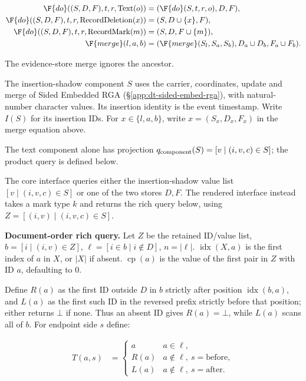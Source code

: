 \[
\begin{aligned}\F{do}((S,D,F),t,r,\operatorname{Text}(o))&=(\F{do}(S,t,r,o),D,F),\\\F{do}((S,D,F),t,r,\operatorname{RecordDeletion}(x))&=(S,D\cup\{x\},F),\\\F{do}((S,D,F),t,r,\operatorname{RecordMark}(m))&=(S,D,F\cup\{m\}),\\\F{merge}(l,a,b)&=(\F{merge}(S_l,S_a,S_b),D_a\cup D_b,F_a\cup F_b).\end{aligned}
\]


The evidence-store merge ignores the ancestor.

The insertion-shadow component $S$ uses the carrier, coordinates, update
and merge of Sided Embedded RGA (\S\ref{app:dt-sided-embed-rga}), with
natural-number character values. Its insertion identity is the event timestamp.
Write $I(S)$ for its insertion IDs.
For $x\in\{l,a,b\}$, write $x=(S_x,D_x,F_x)$ in the merge equation above.

The text component alone has projection $q_{\rm component}(S)=[v\mid(i,v,c)\in S]$; the product query is defined below.

The core interface queries either the insertion-shadow value list
$[v\mid(i,v,c)\in S]$ or one of the two stores $D,F$. The rendered
interface instead takes a mark type $k$ and returns the rich query below,
using $Z=[(i,v)\mid(i,v,c)\in S]$.

\textbf{Document-order rich query.} Let $Z$ be the retained ID/value list, $b=[i\mid(i,v)\in Z]$, $\ell=[i\in b\mid i\notin D]$, $n=|\ell|$. $\operatorname{idx}(X,a)$ is the first index of $a$ in $X$, or $|X|$ if absent. $\operatorname{cp}(a)$ is the value of the first pair in $Z$ with ID $a$, defaulting to $0$.

Define $R(a)$ as the first ID outside $D$ in $b$ strictly after position $\operatorname{idx}(b,a)$, and $L(a)$ as the first such ID in the reversed prefix strictly before that position; either returns $\bot$ if none. Thus an absent ID gives $R(a)=\bot$, while $L(a)$ scans all of $b$. For endpoint side $s$ define:

\[
\begin{aligned}T(a,s)&=\begin{cases}a&a\in\ell,\\R(a)&a\notin\ell,\ s=\mathrm{before},\\L(a)&a\notin\ell,\ s=\mathrm{after}.\end{cases}\end{aligned}
\]


